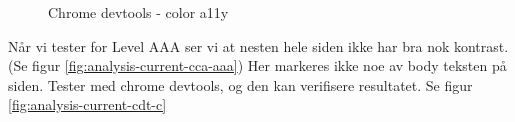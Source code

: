 \begin{figure}[H]
    \begin{center}
        \caption{Chrome devtools - color a11y}
    \end{center}
    
    \label{fig:analysis-current-cdt}
\end{figure}

Når vi tester for Level AAA ser vi at nesten hele siden ikke har bra nok kontrast.
(Se figur \ref{fig:analysis-current-cca-aaa})
Her markeres ikke noe av body teksten på siden.
Tester med chrome devtools, og den kan verifisere resultatet. Se figur \ref{fig:analysis-current-cdt-c}


